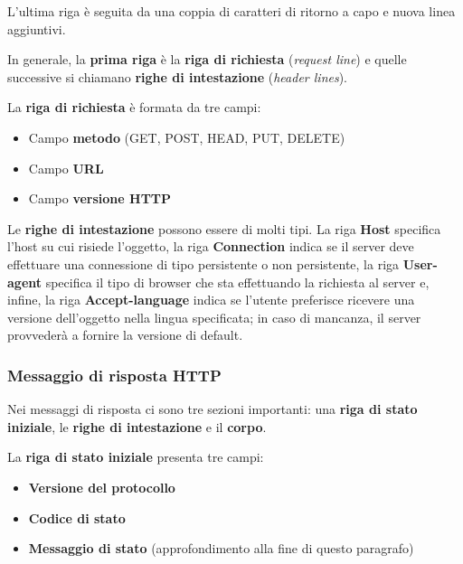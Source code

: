 \documentclass[a4paper]{article}
\begin{document}
	\noindent
	L’ultima riga è seguita da una coppia di caratteri di ritorno a capo e nuova linea aggiuntivi.\newline
	
	\noindent
	In generale, la \textbf{prima riga} è la \textbf{riga di richiesta} (\emph{request line}) e quelle successive si chiamano \textbf{righe di intestazione} (\emph{header lines}).\newline
	
	\noindent
	La \textbf{riga di richiesta} è formata da tre campi:
	
	\begin{itemize}
		\item Campo \textbf{metodo} (GET, POST, HEAD, PUT, DELETE)
		\item Campo \textbf{URL}
		\item Campo \textbf{versione HTTP}
	\end{itemize}
	
	\noindent
	Le \textbf{righe di intestazione} possono essere di molti tipi. La riga \textbf{Host} specifica l’host su cui risiede l’oggetto, la riga \textbf{Connection} indica se il server deve effettuare una connessione di tipo persistente o non persistente, la riga \textbf{User-agent} specifica il tipo di browser che sta effettuando la richiesta al server e, infine, la riga \textbf{Accept-language} indica se l’utente preferisce ricevere una versione dell’oggetto nella lingua specificata; in caso di mancanza, il server provvederà a fornire la versione di default.
	
	\newpage
	
	\subsubsection{Messaggio di risposta HTTP}
	
	Nei messaggi di risposta ci sono tre sezioni importanti: una \textbf{riga di stato iniziale}, le \textbf{righe di intestazione} e il \textbf{corpo}.\newline
	
	\noindent
	La \textbf{riga di stato iniziale} presenta tre campi:
	
	\begin{itemize}
		\item \textbf{Versione del protocollo}
		\item \textbf{Codice di stato}
		\item \textbf{Messaggio di stato} (approfondimento alla fine di questo paragrafo)
	\end{itemize}
\end{document}
